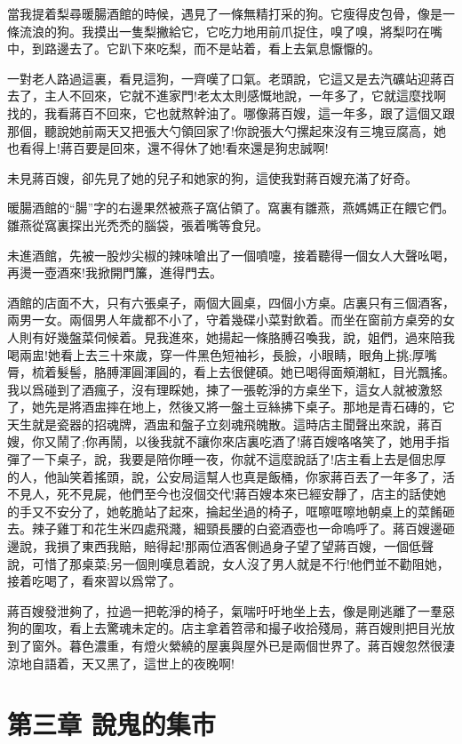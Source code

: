 \documentclass[a6paper]{article}
\begin{document}
當我提着梨尋暖腸酒館的時候，遇見了一條無精打采的狗。它瘦得皮包骨，像是一條流浪的狗。我摸出一隻梨撇給它，它吃力地用前爪捉住，嗅了嗅，將梨叼在嘴中，到路邊去了。它趴下來吃梨，而不是站着，看上去氣息懨懨的。

一對老人路過這裏，看見這狗，一齊嘆了口氣。老頭說，它這又是去汽礦站迎蔣百去了，主人不回來，它就不進家門!老太太則感慨地說，一年多了，它就這麼找啊找的，我看蔣百不回來，它也就熬幹油了。哪像蔣百嫂，這一年多，跟了這個又跟那個，聽說她前兩天又把張大勺領回家了!你說張大勺摞起來沒有三塊豆腐高，她也看得上!蔣百要是回來，還不得休了她!看來還是狗忠誠啊!

未見蔣百嫂，卻先見了她的兒子和她家的狗，這使我對蔣百嫂充滿了好奇。

暖腸酒館的“腸”字的右邊果然被燕子窩佔領了。窩裏有雛燕，燕媽媽正在餵它們。雛燕從窩裏探出光禿禿的腦袋，張着嘴等食兒。

未進酒館，先被一股炒尖椒的辣味嗆出了一個噴嚏，接着聽得一個女人大聲吆喝，再燙一壺酒來!我掀開門簾，進得門去。

酒館的店面不大，只有六張桌子，兩個大圓桌，四個小方桌。店裏只有三個酒客，兩男一女。兩個男人年歲都不小了，守着幾碟小菜對飲着。而坐在窗前方桌旁的女人則有好幾盤菜伺候着。見我進來，她揚起一條胳膊召喚我，說，姐們，過來陪我喝兩盅!她看上去三十來歲，穿一件黑色短袖衫，長臉，小眼睛，眼角上挑;厚嘴脣，梳着髮髻，胳膊渾圓渾圓的，看上去很健碩。她已喝得面頰潮紅，目光飄搖。我以爲碰到了酒瘋子，沒有理睬她，揀了一張乾淨的方桌坐下，這女人就被激怒了，她先是將酒盅摔在地上，然後又將一盤土豆絲拂下桌子。那地是青石磚的，它天生就是瓷器的招魂牌，酒盅和盤子立刻魂飛魄散。這時店主聞聲出來說，蔣百嫂，你又鬧了;你再鬧，以後我就不讓你來店裏吃酒了!蔣百嫂咯咯笑了，她用手指彈了一下桌子，說，我要是陪你睡一夜，你就不這麼說話了!店主看上去是個忠厚的人，他訕笑着搖頭，說，公安局這幫人也真是飯桶，你家蔣百丟了一年多了，活不見人，死不見屍，他們至今也沒個交代!蔣百嫂本來已經安靜了，店主的話使她的手又不安分了，她乾脆站了起來，掄起坐過的椅子，哐嚓哐嚓地朝桌上的菜餚砸去。辣子雞丁和花生米四處飛濺，細頸長腰的白瓷酒壺也一命嗚呼了。蔣百嫂邊砸邊說，我損了東西我賠，賠得起!那兩位酒客側過身子望了望蔣百嫂，一個低聲說，可惜了那桌菜;另一個則嘆息着說，女人沒了男人就是不行!他們並不勸阻她，接着吃喝了，看來習以爲常了。

蔣百嫂發泄夠了，拉過一把乾淨的椅子，氣喘吁吁地坐上去，像是剛逃離了一羣惡狗的圍攻，看上去驚魂未定的。店主拿着笤帚和撮子收拾殘局，蔣百嫂則把目光放到了窗外。暮色濃重，有燈火縈繞的屋裏與屋外已是兩個世界了。蔣百嫂忽然很淒涼地自語着，天又黑了，這世上的夜晚啊!

\pagebreak

\section{第三章 說鬼的集市}
\end{document}
